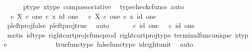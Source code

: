\begin{isabellebody}
\ \ \ \ \isamarkupfalse%
\ p{\isacharunderscore}{\kern0pt}type\ x{\isacharunderscore}{\kern0pt}type\ comp{\isacharunderscore}{\kern0pt}associative{}\ \isamarkupfalse%
\ {\isacharparenleft}{\kern0pt}typecheck{\isacharunderscore}{\kern0pt}cfuncs{\isacharcomma}{\kern0pt}\ auto{\isacharparenright}{\kern0pt}\isanewline
\isanewline
\ \ \isamarkupfalse%
\ {\isachardoublequoteopen}{\isasymt}\ {\isasymcirc}\isactrlsub c\ {\isasymbeta}\isactrlbsub X\ {\isasymtimes}\isactrlsub c\ one\isactrlesub \ {\isasymcirc}\isactrlsub c\ {\isasymlangle}x{\isacharcomma}{\kern0pt}\ id\ one{\isasymrangle}\ {\isacharequal}{\kern0pt}\ {\isasymf}\ {\isasymcirc}\isactrlsub c\ {\isasymbeta}\isactrlbsub X\ {\isasymtimes}\isactrlsub c\ one\isactrlesub \ {\isasymcirc}\isactrlsub c\ {\isasymlangle}x{\isacharcomma}{\kern0pt}\ id\ one{\isasymrangle}{\isachardoublequoteclose}\isanewline
\ \ \ \ \isamarkupfalse%
\ p{\isacharunderscore}{\kern0pt}left{\isacharunderscore}{\kern0pt}proj{\isacharunderscore}{\kern0pt}false\ p{\isacharunderscore}{\kern0pt}left{\isacharunderscore}{\kern0pt}proj{\isacharunderscore}{\kern0pt}true\ \isamarkupfalse%
\ auto\isanewline
\ \ \isamarkupfalse%
\ \isamarkupfalse%
\ {\isachardoublequoteopen}{\isasymt}\ {\isasymcirc}\isactrlsub c\ id\ one\ {\isacharequal}{\kern0pt}\ {\isasymf}\ {\isasymcirc}\isactrlsub c\ id\ one{\isachardoublequoteclose}\isanewline
\ \ \ \ \isamarkupfalse%
\ {\isacharparenleft}{\kern0pt}metis\ id{\isacharunderscore}{\kern0pt}type\ right{\isacharunderscore}{\kern0pt}cart{\isacharunderscore}{\kern0pt}proj{\isacharunderscore}{\kern0pt}cfunc{\isacharunderscore}{\kern0pt}prod\ right{\isacharunderscore}{\kern0pt}cart{\isacharunderscore}{\kern0pt}proj{\isacharunderscore}{\kern0pt}type\ terminal{\isacharunderscore}{\kern0pt}func{\isacharunderscore}{\kern0pt}unique\ x{\isacharunderscore}{\kern0pt}type{\isacharparenright}{\kern0pt}\isanewline
\ \ \isamarkupfalse%
\ \isamarkupfalse%
\ {\isachardoublequoteopen}{\isasymt}\ {\isacharequal}{\kern0pt}\ {\isasymf}{\isachardoublequoteclose}\isanewline
\ \ \ \ \isamarkupfalse%
\ true{\isacharunderscore}{\kern0pt}func{\isacharunderscore}{\kern0pt}type\ false{\isacharunderscore}{\kern0pt}func{\isacharunderscore}{\kern0pt}type\ id{\isacharunderscore}{\kern0pt}right{\isacharunderscore}{\kern0pt}unit{}\ \isamarkupfalse%
\ auto\isanewline
\ \ \isamarkupfalse%
\ \isamarkupfalse%

\end{isabellebody}
